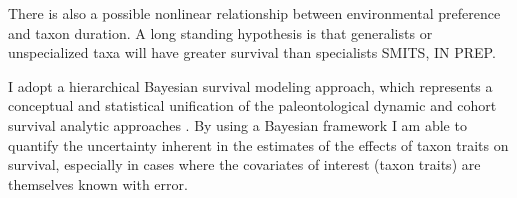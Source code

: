 \documentclass[12pt,letterpaper]{article}
\begin{document}
There is also a possible nonlinear relationship between environmental preference and taxon duration. A long standing hypothesis is that generalists or unspecialized taxa will have greater survival than specialists \citep{Simpson1944,Liow2004a,Liow2007b,Nurnberg2013a,Nurnberg2015,Baumiller1993} \uppercase{Smits, in prep}. 

I adopt a hierarchical Bayesian survival modeling approach, which represents a conceptual and statistical unification of the paleontological dynamic and cohort survival analytic approaches \citep{VanValen1973,VanValen1979,Raup1978,Raup1975,Foote1988,Baumiller1993,Simpson2006}. By using a Bayesian framework I am able to quantify the uncertainty inherent in the estimates of the effects of taxon traits on survival, especially in cases where the covariates of interest (taxon traits) are themselves known with error. 
\end{document}
